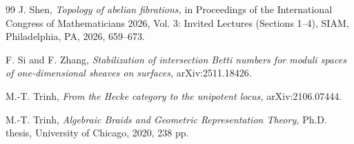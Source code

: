 \documentclass{pspum-l}
\theoremstyle{plain}
\theoremstyle{definition}
\theoremstyle{remark}
\begin{document}
\begin{thebibliography}{99}
 J. Shen, {\em Topology of abelian fibrations,} in Proceedings of the International Congress of Mathematicians 2026, Vol. 3: Invited Lectures (Sections 1--4), SIAM, Philadelphia, PA, 2026, 659--673.








 F. Si and F. Zhang, {\em Stabilization of intersection Betti numbers for moduli spaces of one-dimensional sheaves on surfaces,} arXiv:2511.18426.




 M.-T. Trinh, {\em From the Hecke category to the unipotent locus,} arXiv:2106.07444.

 M.-T. Trinh, {\em Algebraic Braids and Geometric Representation Theory,} Ph.D. thesis, University of Chicago, 2020, 238 pp.
































\end{thebibliography}
\end{document}
